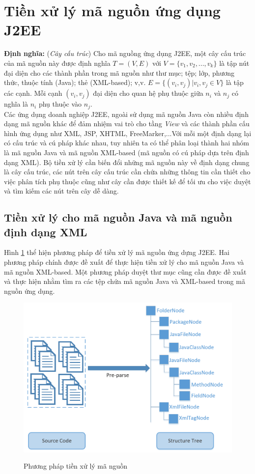 \documentclass[12pt,a4paper]{report}
\begin{document}
\section{Tiền xử lý mã nguồn ứng dụng J2EE}
\textbf{Định nghĩa:} (\textit{Cây cấu trúc}) Cho mã nguồng ứng dụng J2EE, một cây cấu trúc của mã nguồn này được định nghĩa $T = (V, E)$ với $V = \{v_1, v_2,..., v_k\}$ là tập nút đại diện cho các thành phần trong mã nguồn như thư mục; tệp; lớp, phương thức, thuộc tính (Java); thẻ (XML-based); v,v. $E = \{(v_i, v_j) | v_i,v_j \in V\}$ là tập các cạnh. Mỗi cạnh $(v_i,v_j)$ đại diện cho quan hệ phụ thuộc giữa $n_i$ và $n_j$ có nghĩa là $n_i$ phụ thuộc vào $n_j$.\\

Các ứng dụng doanh nghiệp J2EE, ngoài sử dụng mã nguồn Java còn nhiều định dạng mã nguồn khác để đảm nhiệm vai trò cho tầng \textit{View} và các thành phần cấu hình ứng dụng như XML, JSP, XHTML, FreeMarker,...Với mỗi một định dạng lại có cấu trúc và cú pháp khác nhau, tuy nhiên ta có thể phân loại thành hai nhóm là mã nguồn Java và mã nguồn XML-based (mã nguồn có cú pháp dựa trên định dạng XML). Bộ tiền xử lý cần biến đổi những mã nguồn này về định dạng chung là cây cấu trúc, các nút trên cây cấu trúc cần chứa những thông tin cần thiết cho việc phân tích phụ thuộc cũng như cây cần được thiết kế để tối ưu cho việc duyệt và tìm kiếm các nút trên cây dễ dàng.\\

\subsection{Tiền xử lý cho mã nguồn Java và mã nguồn định dạng XML}
Hình \ref{fig:preprocess} thể hiện phương pháp để tiền xử lý mã nguồn ứng dựng J2EE. Hai phương pháp chính được đề xuất để thực hiện tiền xử lý cho mã nguồn Java và mã nguồn XML-based. Một phương pháp duyệt thư mục cũng cần được đề xuất và thực hiện nhằm tìm ra các tệp chứa mã nguồn Java và XML-based trong mã nguồn ứng dụng.\\

\begin{figure}[h]
	\centering
	\includegraphics[scale=0.5]{preprocess}
	\label{fig:preprocess}
	\caption{Phương pháp tiền xử lý mã nguồn}
\end{figure}
\end{document}
